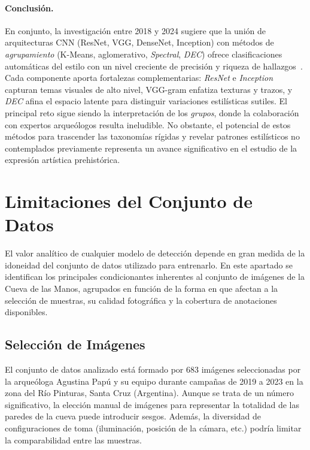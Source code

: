 \paragraph{Conclusión.}
En conjunto, la investigación entre 2018 y 2024 sugiere que la unión de arquitecturas CNN (ResNet, VGG, DenseNet, Inception) con métodos de \textit{agrupamiento} (K-Means, aglomerativo, \textit{Spectral}, \textit{DEC}) ofrece clasificaciones automáticas del estilo con un nivel creciente de precisión y riqueza de hallazgos~\cite{parisotto2022,castellano2022,dangeti2024}.
Cada componente aporta fortalezas complementarias: \textit{ResNet} e \textit{Inception} capturan temas visuales de alto nivel, VGG-gram enfatiza texturas y trazos, y \textit{DEC} afina el espacio latente para distinguir variaciones estilísticas sutiles.
El principal reto sigue siendo la interpretación de los \textit{grupos}, donde la colaboración con expertos arqueólogos resulta ineludible. No obstante, el potencial de estos métodos para trascender las taxonomías rígidas y revelar patrones estilísticos no contemplados previamente representa un avance significativo en el estudio de la expresión artística prehistórica.

\section{Limitaciones del Conjunto de Datos}

El valor analítico de cualquier modelo de detección depende en gran medida de la idoneidad del conjunto de datos utilizado para entrenarlo.
En este apartado se identifican los principales condicionantes inherentes al conjunto de imágenes de la Cueva de las Manos, agrupados en función de la forma en que afectan a la selección de muestras, su calidad fotográfica y la cobertura de anotaciones disponibles.

\subsection{Selección de Imágenes}

El conjunto de datos analizado está formado por 683 imágenes seleccionadas por la arqueóloga Agustina Papú y su equipo durante campañas de 2019 a 2023 en la zona del Río Pinturas, Santa Cruz (Argentina).
Aunque se trata de un número significativo, la elección manual de imágenes para representar la totalidad de las paredes de la cueva puede introducir sesgos.
Además, la diversidad de configuraciones de toma (iluminación, posición de la cámara, etc.) podría limitar la comparabilidad entre las muestras.

